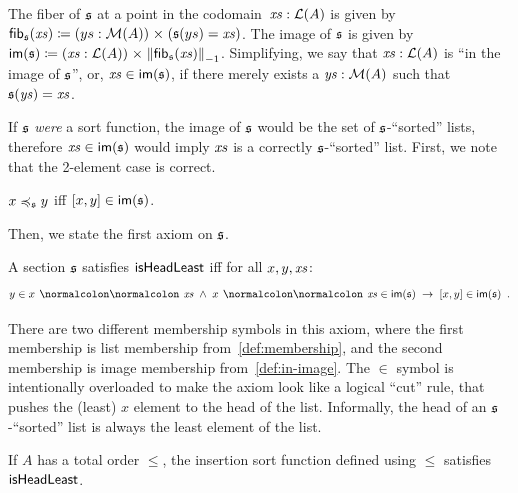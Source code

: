 \begin{definition}
    \label{def:in-image}
    The fiber of $\mathfrak{s}$ at a point in the codomain~$\mathit{xs} : \mathcal{L}(A)$
    is given by $\fib_{\ssection}(\xs) \defeq \dsum{ys : \MM(A)}{(\ssection(ys) = \xs)}$.
    The image of $\mathfrak{s}$ is given by $\im{\ssection} \defeq \dsum{\xs : \LL(A)}{\Trunc[-1]{\fib_{\ssection}(\xs)}}$.
    Simplifying, we say that $\mathit{xs}:\mathcal{L}(A)$ is ``in the image of $\mathfrak{s}$'', or, $\xs \in \im{\ssection}$,
    if there merely exists a $\mathit{ys}:\mathcal{M}(A)$ such that $\mathfrak{s}(\mathit{ys}) = \mathit{xs}$.
\end{definition}
%
If $\mathfrak{s}$ \emph{were} a sort function, the image of $\mathfrak{s}$ would be the set of $\mathfrak{s}$-``sorted'' lists,
therefore $\inimage{\xs}$ would imply $\mathit{xs}$ is a correctly $\mathfrak{s}$-``sorted'' list.
%
First, we note that the 2-element case is correct.
%
\begin{proposition}
    \label{sort:sort-to-order}
    $x \preccurlyeq_{\mathfrak{s}} y$ \; iff \; $\inimage{[x, y]}$.
\end{proposition}
%
\noindent Then, we state the first axiom on $\mathfrak{s}$.
\begin{definition}
    \label{sort:head-least}
    A section $\mathfrak{s}$ satisfies $\operatorname{\mathsf{isHeadLeast}}$ iff for all $x, y, \mathit{xs}$:
    \[
        y \in x \cons \xs \; \land \; \inimage{x \cons \xs} \; \to \; \inimage{[x, y]}
        \enspace.
    \]
\end{definition}
\noindent
There are two different membership symbols in this axiom,
where the first membership is list membership from~\cref{def:membership},
and the second membership is image membership from~\cref{def:in-image}.
%
The $\in$ symbol is intentionally overloaded to make the axiom look like a logical ``cut'' rule,
that pushes the (least) $x$ element to the head of the list.
Informally, the head of an $\mathfrak{s}$-``sorted'' list is always the least element of the list.

\begin{proposition}
    \label{prop:order-to-sort-head-least}
    If $A$ has a total order $\leq$,
    the insertion sort function defined using $\leq$ satisfies $\operatorname{\mathsf{isHeadLeast}}$.
\end{proposition}

